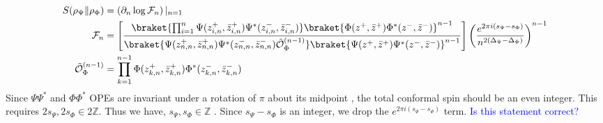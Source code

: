 \documentclass[11pt]{article}
\newcommand{\p}{\partial}
\newcommand{\mO}{\mathcal{O}}
\newcommand{\nn}{\nonumber}
\newcommand{\lb}{\left(}
\newcommand{\rb}{\right)}
\newcommand{\NL}[1]{\textcolor{blue}{#1}}
\newcommand{\JM}[1]{\textcolor{orange}{#1}}
\begin{document}
\begin{align}
  S(\rho_\Psi\|\rho_\Phi)&=\lb\p_n\log\mathcal{F}_n\rb|_{n=1}\nn\\
  \mathcal{F}_n&=\left[\frac{\braket{\prod_{i=1}^{n} \Psi(z^+_{i,n},\bar z^+_{i,n})\Psi^*(z^-_{i,n},\bar z^-_{i,n})}\braket{\Phi(z^+,\bar z^+)\Phi^*(z^-,\bar z^-)}^{n-1}}{\braket{\Psi(z^+_{n,n}, \bar z^+_{n,n})\Psi^*(z^-_{n,n}, \bar z^-_{n,n})\tilde{\mO}^{(n-1)}_{\Phi}}\braket{\Psi(z^+,\bar z^+)\Psi^*(z^-,\bar z^-)}^{n-1}}\right]\lb \frac{e^{2\pi i (s_\Psi-s_\Phi)}}{n^{2(\Delta_\Psi-\Delta_\Phi)}}\rb^{n-1}\label{fncorrspin}\\
  \tilde{\mO}^{(n-1)}_\Phi&= \prod_{k=1}^{n-1} \Phi(z^+_{k,n},\bar z^+_{k,n})\Phi^*(z^-_{k,n},\bar z^-_{k,n})
\end{align}
Since $\Psi \Psi^*$ and $\Phi \Phi^*$ OPEs are invariant under a rotation of $\pi$ about its midpoint \cite{calabrese2011entanglement}, the total conformal spin should be an even integer. This requires $2s_\Psi, 2s_\Phi \in 2\mathbb{Z}$. Thus we have, $s_\Psi, s_\Phi \in \mathbb{Z}$ \cite{calabrese2011entanglement}. 
Since 
$s_\Psi-s_\Phi$
is an integer, we drop the 
$e^{2\pi i (s_\Psi-s_\Phi)}$ 
term. \NL{Is this statement correct?}
\end{document}
